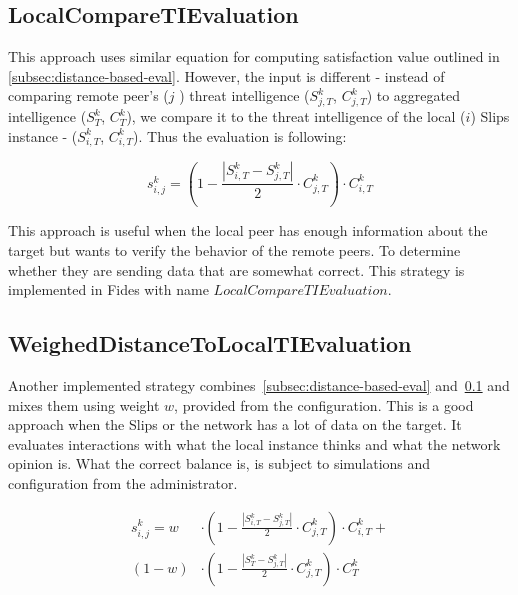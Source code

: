 \subsection{LocalCompareTIEvaluation}
\label{subsec:use-local-threat-to-evaluate}
This approach uses similar equation for computing satisfaction value outlined in \ref{subsec:distance-based-eval}. However, the input is different - instead of comparing remote peer's ($j$ ) threat intelligence ($S^{k}_{j, T}$, $C^{k}_{j, T}$) to aggregated intelligence ($S^{k}_{T}$, $C^{k}_{T}$), we compare it to the threat intelligence of the local ($i$) Slips instance - ($S^{k}_{i, T}$, $C^{k}_{i, T}$). Thus the evaluation is following:

\begin{equation}
s^{k}_{i, j} = \left(1 - \frac{|{S}^{k}_{i, T} - S^{k}_{j, T}|}{2} \cdot C^{k}_{j, T}\right) \cdot C^{k}_{i, T}
\end{equation}

This approach is useful when the local peer has enough information about the target but wants to verify the behavior of the remote peers.
To determine whether they are sending data that are somewhat correct. This strategy is implemented in Fides with name $LocalCompareTIEvaluation$.

\subsection{WeighedDistanceToLocalTIEvaluation}
\label{subsec:weigh-local-opinion-with-aggregated-one}
Another implemented strategy combines~\ref{subsec:distance-based-eval} and~\ref{subsec:use-local-threat-to-evaluate} and mixes them using weight $w$, provided from the configuration.
This is a good approach when the Slips or the network has a lot of data on the target. It evaluates interactions with what the local instance thinks and what the network opinion is.
What the correct balance is,  is subject to simulations and configuration from the administrator.

\begin{equation}
\begin{split}
    s^{k}_{i, j} = w &\cdot \left(1 - \frac{|{S}^{k}_{i, T} - S^{k}_{j, T}|}{2} \cdot C^{k}_{j, T}\right) \cdot C^{k}_{i, T} + \\
    (1-w) &\cdot \left(1 - \frac{|{S}^{k}_{T} - S^{k}_{j, T}|}{2} \cdot C^{k}_{j, T}\right) \cdot C^{k}_{T}
\end{split}
\end{equation}


